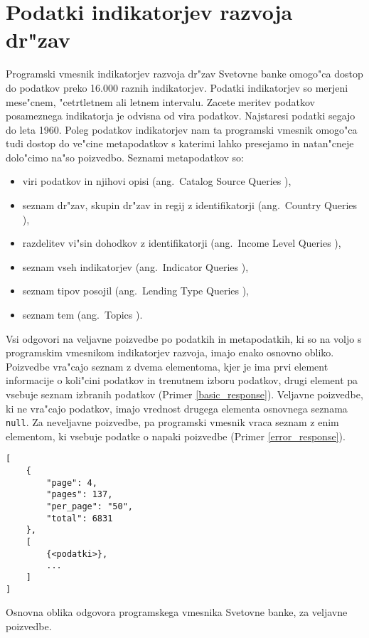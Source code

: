 \section{Podatki indikatorjev razvoja dr"zav}



Programski vmesnik indikatorjev razvoja dr"zav Svetovne banke omogo"ca dostop
do podatkov preko 16.000 raznih indikatorjev. Podatki indikatorjev so merjeni
mese"cnem, "cetrtletnem ali letnem intervalu. Zacete meritev podatkov
posameznega indikatorja je odvisna od vira podatkov. Najstaresi podatki segajo
do leta 1960. Poleg podatkov indikatorjev nam ta programski vmesnik omogo"ca tudi dostop do ve"cine
metapodatkov s katerimi lahko presejamo in natan"cneje dolo"cimo na"so poizvedbo.
Seznami metapodatkov so:
\begin{itemize}
\item viri podatkov in njihovi opisi (ang.\ Catalog Source Queries
	),
\item seznam dr"zav, skupin dr"zav in regij z identifikatorji (ang.\ Country Queries
	),
\item razdelitev vi"sin dohodkov z identifikatorji (ang.\ Income Level Queries
	),
\item seznam vseh indikatorjev (ang.\ Indicator Queries
  ),
\item seznam tipov posojil (ang.\ Lending Type Queries
	),
\item seznam tem (ang.\ Topics ).
\end{itemize}


Vsi odgovori na veljavne poizvedbe po podatkih in metapodatkih, ki so na voljo
s programskim vmesnikom indikatorjev razvoja, imajo enako osnovno obliko. 
Poizvedbe vra"cajo seznam z dvema elementoma, kjer je ima prvi element 
informacije o koli"cini podatkov in trenutnem izboru podatkov, drugi element 
pa vsebuje seznam izbranih podatkov (Primer \ref{basic_response}). 
Veljavne poizvedbe, ki ne vra"cajo podatkov, imajo vrednost drugega elementa
osnovnega seznama \verb|null|.
Za neveljavne poizvedbe, pa programski vmesnik vraca seznam z enim elementom,
ki vsebuje podatke o napaki poizvedbe (Primer \ref{error_response}).


\begin{snippet}
\begin{center}
\begin{lstlisting}
[
    {
        "page": 4,
        "pages": 137,
        "per_page": "50",
        "total": 6831
    },
    [
        {<podatki>},
        ...
    ]
]
\end{lstlisting}
\end{center}
\caption{Osnovna oblika odgovora programskega vmesnika Svetovne banke, za
veljavne poizvedbe.}
\label{basic_response}
\end{snippet} 


